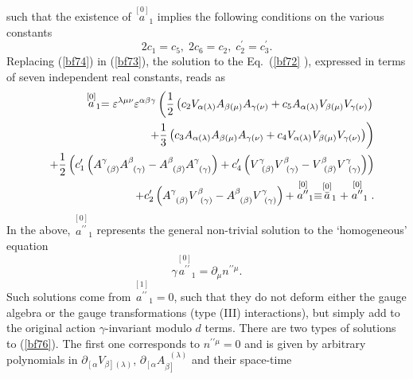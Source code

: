 \documentclass[a4paper,11pt]{article}
\begin{document}
such that the existence of $\stackrel{[0]}{a}_{1}$ implies the following
conditions on the various constants
\begin{equation}
2c_{1}=c_{5},\;2c_{6}=c_{2},\;c_{2}^{\prime }=c_{3}^{\prime }.  \label{bf74}
\end{equation}
Replacing (\ref{bf74}) in (\ref{bf73}), the solution to the Eq.~(\ref{bf72}%
), expressed in terms of seven independent real constants, reads as
\begin{eqnarray}
&&\stackrel{\lbrack 0]}{a}_{1}=\varepsilon ^{\lambda \mu \nu }\varepsilon
^{\alpha \beta \gamma }\left( \frac{1}{2}\left( c_{2}V_{\alpha (\lambda
)}A_{\beta (\mu )}A_{\gamma (\nu )}+c_{5}A_{\alpha (\lambda )}V_{\beta (\mu
)}V_{\gamma (\nu )}\right) \right.  \nonumber \\
&&\left. +\frac{1}{3}\left( c_{3}A_{\alpha (\lambda )}A_{\beta (\mu
)}A_{\gamma (\nu )}+c_{4}V_{\alpha (\lambda )}V_{\beta (\mu )}V_{\gamma (\nu
)}\right) \right)  \nonumber \\
&&+\frac{1}{2}\left( c_{1}^{\prime }\left( A_{\;\;(\beta )}^{\gamma
}A_{\;\;(\gamma )}^{\beta }-A_{\;\;(\beta )}^{\beta }A_{\;\;(\gamma
)}^{\gamma }\right) +c_{4}^{\prime }\left( V_{\;\;(\beta )}^{\gamma
}V_{\;\;(\gamma )}^{\beta }-V_{\;\;(\beta )}^{\beta }V_{\;\;(\gamma
)}^{\gamma }\right) \right)  \nonumber \\
&&+c_{2}^{\prime }\left( A_{\;\;(\beta )}^{\gamma }V_{\;\;(\gamma )}^{\beta
}-A_{\;\;(\beta )}^{\beta }V_{\;\;(\gamma )}^{\gamma }\right) +\stackrel{[0]%
}{a^{\prime \prime }}_{1}\equiv \stackrel{[0]}{\bar{a}}_{1}+\stackrel{[0]}{%
a^{\prime \prime }}_{1}.  \label{bf75}
\end{eqnarray}
In the above, $\stackrel{[0]}{a^{\prime \prime }}_{1}$ represents the
general non-trivial solution to the `homogeneous' equation
\begin{equation}
\gamma \stackrel{[0]}{a^{\prime \prime }}_{1}=\partial _{\mu }n^{\prime
\prime \mu }.  \label{bf76}
\end{equation}
Such solutions come from $\stackrel{[1]}{a^{\prime \prime }}_{1}=0$, such
that they do not deform either the gauge algebra or the gauge
transformations (type (III) interactions), but simply add to the original
action $\gamma $-invariant modulo $d$ terms. There are two types of
solutions to (\ref{bf76}). The first one corresponds to $n^{\prime \prime
\mu }=0$ and is given by arbitrary polynomials in $\partial _{\left[ \alpha
\right. }V_{\left. \beta \right] (\lambda )}$, $\partial _{\left[ \alpha
\right. }A_{\left. \beta \right] }^{\;\;(\lambda )}$ and their space-time
\end{document}
